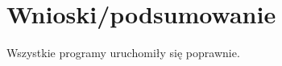 \documentclass[12pt,a4paper]{article}
\begin{document}
		\begin{minipage}{.5\textwidth}
			
		\end{minipage}%
		\begin{minipage}{.5\textwidth}
			
		\end{minipage}
		
		\begin{minipage}{.5\textwidth}
			
		\end{minipage}%
		\begin{minipage}{.5\textwidth}
			
		\end{minipage}

	\section{Wnioski/podsumowanie}
	
			Wszystkie programy uruchomiły się poprawnie.
	
\end{document}
